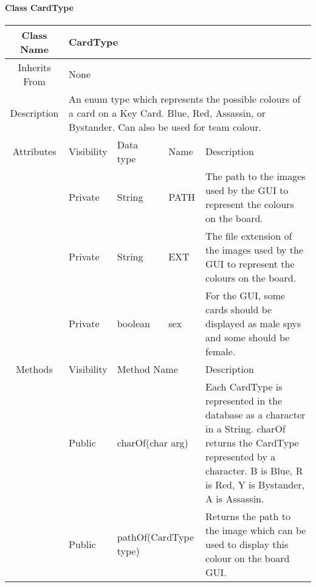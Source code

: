 \paragraph{Class CardType}\mbox{}
\begin{tabularx}{\textwidth}{|c||l|l|l|X|}
    \hline
    \cellcolor{lightgray}Class Name & \multicolumn{4}{X|}{CardType}\\
    \hline
    \cellcolor{lightgray}Inherits From & \multicolumn{4}{X|}{None}\\
    \hline
    \cellcolor{lightgray}Description & \multicolumn{4}{p{12cm}|}{An enum type which represents the possible colours of a card on a Key Card. Blue, Red, Assassin, or Bystander. Can also be used for team colour.}\\

    \hline\hline
    \cellcolor{lightgray}Attributes & \cellcolor{lightgray}Visibility & \cellcolor{lightgray}Data type & \cellcolor{lightgray}Name & \cellcolor{lightgray}Description\\\cline{2-5}
    \cellcolor{lightgray} & Private & String & PATH & The path to the images used by the GUI to represent the colours on the board.\\
    \hline    
    \cellcolor{lightgray} & Private & String & EXT & The file extension of the images used by the GUI to represent the colours on the board.\\
    \hline    
    \cellcolor{lightgray} & Private & boolean & sex & For the GUI, some cards should be displayed as male spys and some should be female.\\
    \hline\hline
    \cellcolor{lightgray}Methods & \cellcolor{lightgray}Visibility & \multicolumn{2}{l|}{\cellcolor{lightgray}Method Name} & \cellcolor{lightgray}Description\\\cline{2-5}
    \hline
    \cellcolor{lightgray} & Public & \multicolumn{2}{l|}{charOf(char arg)} & Each CardType is represented in the database as a character in a String. charOf returns the CardType represented by a character. B is Blue, R is Red, Y is Bystander, A is Assassin.\\
    \hline
    \cellcolor{lightgray} & Public & \multicolumn{2}{l|}{pathOf(CardType type)} & Returns the path to the image which can be used to display this colour on the board GUI.\\
    \hline
\end{tabularx}